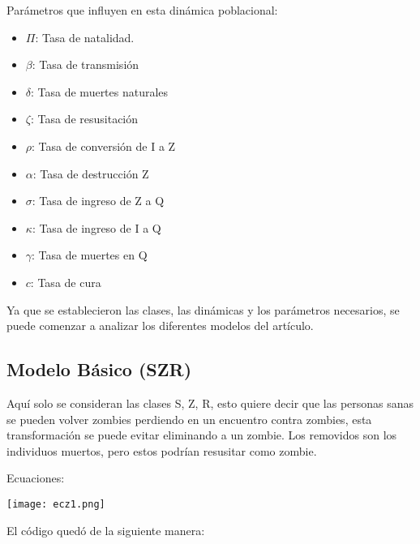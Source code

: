 \documentclass[12pt,letterpaper]{article}
\begin{document}
Parámetros que influyen en esta dinámica poblacional:

\begin{itemize}

\item $\Pi$: Tasa de natalidad.
\item $\beta$: Tasa de transmisión
\item $\delta$: Tasa de muertes naturales
\item $\zeta$: Tasa de resusitación
\item $\rho$: Tasa de conversi\'on de I a Z
\item $\alpha$: Tasa de destrucci\'on Z
\item $\sigma$: Tasa de ingreso de Z a Q
\item $\kappa$: Tasa de ingreso de I a Q
\item $\gamma$: Tasa de muertes en Q
\item $c$: Tasa de cura
\end{itemize}

Ya que se establecieron las clases, las din\'amicas y los par\'ametros necesarios, se puede comenzar a analizar los diferentes modelos del art\'iculo.

\subsection*{Modelo B\'asico (SZR)}

Aqu\'i solo se consideran las clases S, Z, R, esto quiere decir que las personas sanas se pueden volver zombies perdiendo en un encuentro contra zombies, esta transformaci\'on se puede evitar eliminando a un zombie. Los removidos son los individuos muertos, pero estos podr\'ian resusitar como zombie.

Ecuaciones:
\begin{center}
\texttt{[image: ecz1.png]}
\end{center}

El c\'odigo qued\'o de la siguiente manera: 
\end{document}
